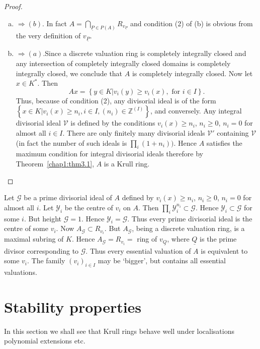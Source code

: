   \begin{proof} %
  \begin{enumerate}[(a)]
 \item $ \Rightarrow (b)$. In fact $A = \bigcap\limits_{\underline{P}
   \in P(A)} R_{v_{\underline{P}}}$ and condition (2) of (b) is
   obvious from the very definition of $v_{\underline{P}}$. 

 \item $\Rightarrow (a)$.\pageoriginale Since a discrete valuation ring is
   completely integrally closed and any intersection of completely
   integrally closed domains is completely integrally closed, we
   conclude that $A$ is completely integrally closed. Now let $x \in
   K^*$. Then 
 $$
 Ax = \left \{y \in K \big| v_i (y) \ge v_i (x), \text{ for } i \in I
 \right\}. 
 $$
 Thus, because of condition (2), any divisorial ideal is of the form
 $\left\{ x \in K \big|  v_i (x) \ge n_i, i \in I, (n_i) \in
 \mathbb{Z}^{(I)} \right\}$, and conversely. Any integral divisorial
 ideal $\mathscr{V}$ is defined by the conditions $v_i (x) \ge n_i$,
 $n_i \ge 0$, $n_i = 0$ for almost all $i \in I$. There are only
 finitely many divisorial ideals $\mathscr{V}'$ containing
 $\mathscr{V}$ (in fact the number of such ideals is $\prod\limits_i
 (1+n_i))$. Hence $A$ satisfies the maximum condition for integral
 divisorial ideals  therefore by Theorem~\ref{chap1:thm3.1}, $A$ is a
 Krull ring.  
  \end{enumerate}
  \end{proof}  
  
\begin{remark*}
Let $\mathscr{G}$ be a prime divisorial ideal of $A$ defined by $v_i
(x) \ge n_i$, $n_i \ge 0$, $n_i = 0$ for almost all $i$. Let
$\mathscr{Y}_i$ be the centre of $v_i $ on $A$. Then $\prod\limits_i
\mathscr{Y}_i^{n_i} \subset \mathscr{G}$. Hence $\mathscr{Y}_i \subset
\mathscr{G}$ for some $i$. But height $\mathscr{G} = 1$. Hence
$\mathscr{Y}_i = \mathscr{G}$. Thus every prime divisorial ideal is
the centre of some $v_i$. Now $A_\mathscr{G} \subset R_{v_i}$. But
$A_\mathscr{G}$, being a discrete valuation ring, is a maximal subring
of $K$. Hence $A_\mathscr{G} = R_{v_i} = $ ring of
$v_{\underline{Q}}$, where $\underline{Q}$ is the prime divisor
corresponding to $\mathscr{G}$. Thus every essential valuation of $A$
is equivalent to some $v_i$. The family $(v_i)_{i \in I}$ may be
`bigger', but contains all essential valuations. 
\end{remark*}  
  

  \section{Stability properties}\label{chap1:sec4}%
    In this section we shall see that Krull rings behave well under
  localisations polynomial extensions etc. 
 
